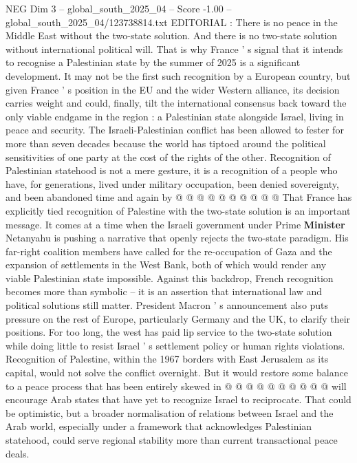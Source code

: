 \begin{textsample}{NEG Dim 3 – global\_south\_2025\_04 – Score -1.00 – global\_south\_2025\_04/123738814.txt}  \label{ex:f3_neg_343}
EDITORIAL : There is no peace in the Middle East without the two-state solution.
And there is no two-state solution without international political will.
That is why France ' s signal that it intends to recognise a Palestinian state by the summer of 2025 is a significant development.
It may not be the first such recognition by a European country, but given France ' s position in the EU and the wider Western alliance, its decision carries weight and could, finally, tilt the international consensus back toward the only viable endgame in the region : a Palestinian state alongside Israel, living in peace and security.
The Israeli-Palestinian conflict has been allowed to fester for more than seven decades because the world has tiptoed around the political sensitivities of one party at the cost of the rights of the other.
Recognition of Palestinian statehood is not a mere gesture, it is a recognition of a people who have, for generations, lived under military occupation, been denied sovereignty, and been abandoned time and again by @ @ @ @ @ @ @ @ @ @ That France has explicitly tied recognition of Palestine with the two-state solution is an important message.
It comes at a time when the Israeli government under Prime \textbf{Minister} Netanyahu is pushing a narrative that openly rejects the two-state paradigm.
His far-right coalition members have called for the re-occupation of Gaza and the expansion of settlements in the West Bank, both of which would render any viable Palestinian state impossible.
Against this backdrop, French recognition becomes more than symbolic -- it is an assertion that international law and political solutions still matter.
President Macron ' s announcement also puts pressure on the rest of Europe, particularly Germany and the UK, to clarify their positions.
For too long, the west has paid lip service to the two-state solution while doing little to resist Israel ' s settlement policy or human rights violations.
Recognition of Palestine, within the 1967 borders with East Jerusalem as its capital, would not solve the conflict overnight.
But it would restore some balance to a peace process that has been entirely skewed in @ @ @ @ @ @ @ @ @ @ will encourage Arab states that have yet to recognize Israel to reciprocate.
That could be optimistic, but a broader normalisation of relations between Israel and the Arab world, especially under a framework that acknowledges Palestinian statehood, could serve regional stability more than current transactional peace deals.

\end{textsample}
